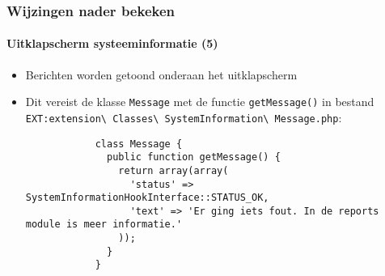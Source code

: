 \begin{frame}[fragile]
	\frametitle{Wijzingen nader bekeken}
	\framesubtitle{Uitklapscherm systeeminformatie (5)}

	\lstset{basicstyle=\tiny\ttfamily}

	\begin{itemize}

		\item Berichten worden getoond onderaan het uitklapscherm

		\item Dit vereist de klasse \texttt{Message} met de functie \texttt{getMessage()} in bestand
			\small
				\texttt{EXT:extension\textbackslash
					Classes\textbackslash
					SystemInformation\textbackslash
					Message.php}:
			\normalsize

		\begin{lstlisting}
			class Message {
			  public function getMessage() {
			    return array(array(
			      'status' => SystemInformationHookInterface::STATUS_OK,
			      'text' => 'Er ging iets fout. In de reports module is meer informatie.'
			    ));
			  }
			}
		\end{lstlisting}

	\end{itemize}

\end{frame}


